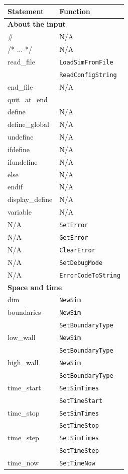 \documentclass {scrbook}
\newcommand {\ttt} {\texttt}
\begin{document}
\begin{longtable}[c]{ll}
Statement & Function\\
\hline
\multicolumn{2}{l}{\hspace{0.3in}\textbf{About the input}}\\
\hline
\# & N/A\\
/* ... */ & N/A\\
read\_file & \ttt{LoadSimFromFile}\\
& \ttt{ReadConfigString}\\
end\_file & N/A\\
quit\_at\_end \\ %
define & N/A\\
define\_global & N/A\\
undefine & N/A\\
ifdefine & N/A\\
ifundefine & N/A\\
else & N/A\\
endif & N/A\\
display\_define & N/A\\
variable & N/A\\ %
N/A & \ttt{SetError}\\
N/A & \ttt{GetError}\\
N/A & \ttt{ClearError}\\
N/A & \ttt{SetDebugMode}\\
N/A & \ttt{ErrorCodeToString}\\
\hline
\multicolumn{2}{l}{\hspace{0.3in}\textbf{Space and time}}\\
\hline
dim & \ttt{NewSim}\\
boundaries & \ttt{NewSim}\\
& \ttt{SetBoundaryType}\\
low\_wall & \ttt{NewSim}\\
& \ttt{SetBoundaryType}\\
high\_wall & \ttt{NewSim}\\
& \ttt{SetBoundaryType}\\
time\_start & \ttt{SetSimTimes}\\
& \ttt{SetTimeStart}\\
time\_stop & \ttt{SetSimTimes}\\
& \ttt{SetTimeStop}\\
time\_step & \ttt{SetSimTimes}\\
& \ttt{SetTimeStep}\\
time\_now & \ttt{SetTimeNow}\\

\end{longtable}
\end{document}
